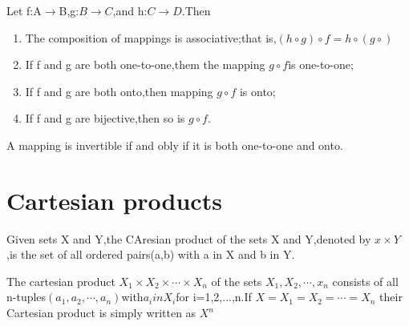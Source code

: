 \documentclass[cn,10pt,math=newtx,citestyle=gb7714-2015,bibstyle=gb7714-2015]{elegantbook}
\begin{document}
\begin{theorem}
	Let f:A$\to$B,g:$B\to C$,and h:$C\to D$.Then
	\begin{enumerate}
		\item The composition of mappings is associative;that is,$(h\circ g)\circ f=h\circ(g\circ)$
		\item If f and g are both one-to-one,them the mapping $g\circ f$is one-to-one;
		\item If f and g are both onto,then mapping $g\circ f$ is onto;
		\item If f and g are bijective,then so is $g\circ f$.
		     
	\end{enumerate}
\end{theorem}
\begin{theorem}
	A mapping is invertible if and obly if it is both one-to-one and onto.
\end{theorem}

\section{Cartesian products}

\begin{definition}
	Given sets X and Y,the CAresian product of the 
	sets X and Y,denoted by $x\times Y$,is the set of all ordered pairs(a,b) with a in X and b in Y.  
\end{definition}
\begin{note}
	The cartesian product $X_1\times X_2\times \cdots \times X_n$ of the sets $X_1,X_2,\cdots,x_n$ consists of all n-tuples$(a_1,a_2,\cdots,a_n)$with$a_i in X_i$for i=1,2,...,n.If $X=X_1=X_2=\cdots=X_n$ their Cartesian product is simply written as $X^n$
\end{note}
	
\newpage
\end{document}
